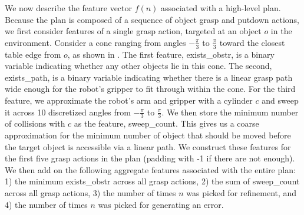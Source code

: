 We now describe the feature vector $f(n)$ associated with a high-level plan. Because the plan is composed
of a sequence of object grasp and putdown actions, we first consider features of a single grasp action, targeted
at an object $o$ in the environment. Consider a cone ranging from angles $-\frac{\pi}{3}$ to $\frac{\pi}{3}$
toward the closest table edge from $o$, as shown in . The first feature, exists\_obstr, is a binary variable indicating
whether any other objects lie in this cone. The second, exists\_path, is a binary variable indicating whether there is a linear
grasp path wide enough for the robot's gripper to fit through within the cone. For the third feature, we approximate the robot's arm and gripper with a cylinder $c$ and sweep it across 10 discretized angles from $-\frac{\pi}{3}$ to
$\frac{\pi}{3}$. We then store the minimum number of collisions with $c$ as the feature, sweep\_count. This gives us a coarse approximation for the minimum number of object that should be moved before the target object is accessible via a linear path.
We construct these features for the first five grasp actions in the plan (padding with -1 if there are not enough).
We then add on the following aggregate features associated with the entire plan: 1) the minimum exists\_obstr across all grasp actions,
2) the sum of sweep\_count across all grasp actions, 3) the number of times $n$ was picked for refinement,
and 4) the number of times $n$ was picked for generating an error.
